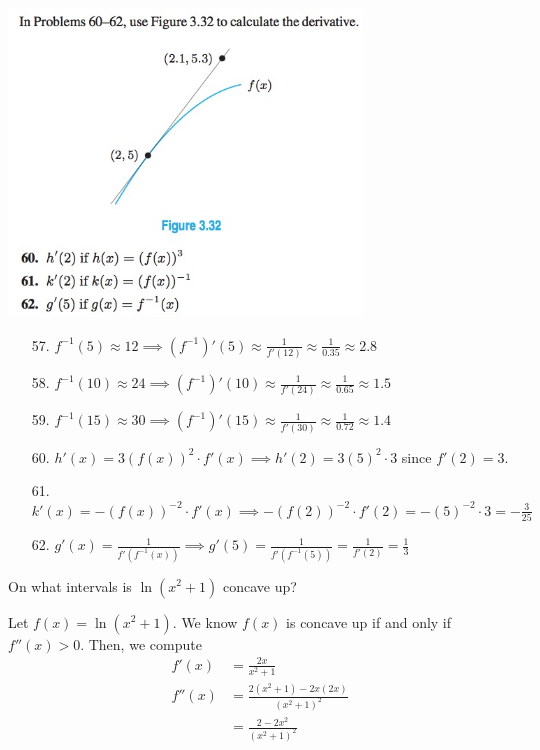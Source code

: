 \documentclass[11pt]{exam}
\begin{document}
\begin{questions}
\begin{multicols}{2}
\columnbreak

\includegraphics[width=3.7in]{no60to62.jpg}
\end{multicols}
\begin{solution}
  \begin{enumerate}
  \item[57.] \(f^{-1}(5) \approx 12 \implies (f^{-1})'(5) \approx \frac{1}{f'(12)} \approx \frac{1}{0.35} \approx 2.8\)
  \item[58.] \(f^{-1}(10) \approx 24 \implies (f^{-1})'(10) \approx \frac{1}{f'(24)} \approx \frac{1}{0.65} \approx 1.5\)
  \item[59.]\(f^{-1}(15) \approx 30 \implies (f^{-1})'(15) \approx \frac{1}{f'(30)} \approx \frac{1}{0.72} \approx 1.4\) 
  \item[60.] \(h'(x) = 3(f(x))^2 \cdot f'(x) \implies h'(2) = 3(5)^2
    \cdot 3\) since \(f'(2) = 3\).
  \item[61.] \(k'(x) = -(f(x))^{-2} \cdot f'(x) \implies -(f(2))^{-2}
    \cdot f'(2) = -(5)^{-2} \cdot 3 = -\frac{3}{25}\)
  \item[62.] \(g'(x) = \frac{1}{f'(f^{-1}(x))} \implies g'(5)=
    \frac{1}{f'(f^{-1}(5))} = \frac{1}{f'(2)} = \frac{1}{3}\)
  \end{enumerate}
\end{solution}
\question On what intervals is $\ln(x^2+1)$ concave up?
  \begin{solution}
    Let \(f(x) = \ln(x^2+1)\). We know \(f(x)\) is concave up if and
    only if \(f''(x) > 0\). Then, we compute
    \begin{align*}
      f'(x) & = \frac{2x}{x^2+1} \\
      f''(x) & = \frac{2(x^2+1)-2x(2x)}{(x^2+1)^2} \\
      & = \frac{2-2x^2}{(x^2+1)^2}

\end{align*}
\end{solution}
\end{questions}
\end{document}
